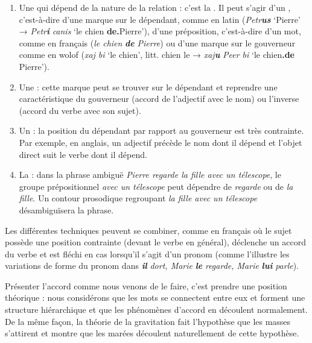 {    \begin{enumerate}
    \item    Une  qui dépend de la nature de la relation : c’est la . Il peut s’agir d’un , c’est-à-dire d’une marque sur le dépendant, comme en latin (\textit{Petr}\textbf{\textit{us}} ‘Pierre’ \textrm{→} \textit{Petr}\textbf{\textit{i}} \textit{canis} ‘le chien \textbf{de.}Pierre’), d’une préposition, c’est-à-dire d’un mot, comme en français (\textit{le chien} \textbf{\textit{de} }\textit{Pierre}) ou d’une marque sur le gouverneur comme en wolof (\textit{xaj bi} ‘le chien’, litt. chien le \textrm{→} \textit{xaj}\textbf{\textit{u}} \textit{Peer bi} ‘le chien\textbf{.de} Pierre’).
    \item    Une  : cette marque peut se trouver sur le dépendant et reprendre une caractéristique du gouverneur (accord de l’adjectif avec le nom) ou l’inverse (accord du verbe avec son sujet).
    \item    Un  : la position du dépendant par rapport au gouverneur est très contrainte. Par exemple, en anglais, un adjectif précède le nom dont il dépend et l’objet direct suit le verbe dont il dépend.
    \item   La  : dans la phrase ambiguë \textit{Pierre regarde la fille avec un télescope}, le groupe prépositionnel \textit{avec un télescope} peut dépendre de \textit{regarde} ou de \textit{la fille}. Un contour prosodique regroupant \textit{la fille avec un télescope} désambiguïsera la phrase.
    \end{enumerate}
 

    Les différentes techniques peuvent se combiner, comme en français où le sujet possède une position contrainte (devant le verbe en général), déclenche un accord du verbe et est fléchi en cas lorsqu’il s’agit d’un pronom (comme l'illustre les variations de forme du pronom dans \textbf{\textit{il}} \textit{dort, Marie} \textbf{\textit{le}} \textit{regarde, Marie} \textbf{\textit{lui}} \textit{parle}).

    Présenter l’accord comme nous venons de le faire, c’est prendre une position théorique : nous considérons que les mots se connectent entre eux et forment une structure hiérarchique et que les phénomènes d’accord en découlent normalement. De la même façon, la théorie de la gravitation fait l’hypothèse que les masses s’attirent et montre que les marées découlent naturellement de cette hypothèse.
}
